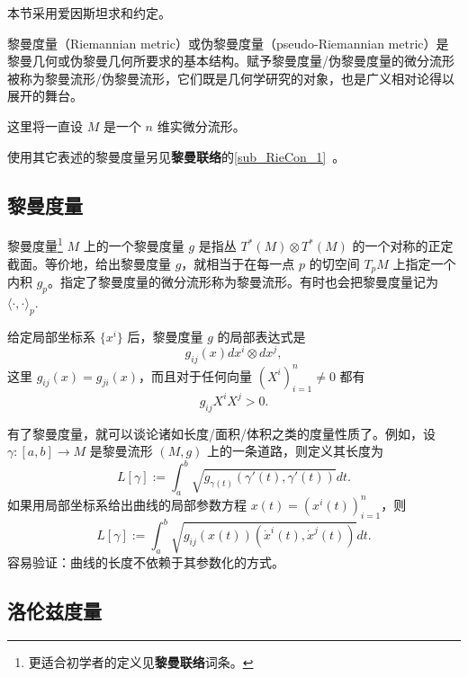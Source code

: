 
本节采用爱因斯坦求和约定。

黎曼度量（Riemannian metric）或伪黎曼度量（pseudo-Riemannian metric）是黎曼几何或伪黎曼几何所要求的基本结构。赋予黎曼度量/伪黎曼度量的微分流形被称为黎曼流形/伪黎曼流形，它们既是几何学研究的对象，也是广义相对论得以展开的舞台。

这里将一直设 $M$ 是一个 $n$ 维实微分流形。

使用其它表述的黎曼度量另见\textbf{黎曼联络}的\autoref{sub_RieCon_1}~。

\subsection{黎曼度量}
\begin{definition}{黎曼度量\footnote{更适合初学者的定义见\textbf{黎曼联络}词条。}}
$M$ 上的一个黎曼度量 $g$ 是指丛 $T^*(M)\otimes T^*(M)$ 的一个对称的正定截面。等价地，给出黎曼度量 $g$，就相当于在每一点 $p$ 的切空间 $T_pM$ 上指定一个内积 $g_p$。指定了黎曼度量的微分流形称为黎曼流形。有时也会把黎曼度量记为 $\langle\cdot,\cdot\rangle_p$.
\end{definition}
给定局部坐标系 $\{x^i\}$ 后，黎曼度量 $g$ 的局部表达式是
$$
g_{ij}(x)dx^i\otimes dx^j,
$$
这里 $g_{ij}(x)=g_{ji}(x)$，而且对于任何向量 $(X^i)_{i=1}^n\neq0$ 都有
$$
g_{ij}X^iX^j>0.
$$

有了黎曼度量，就可以谈论诸如长度/面积/体积之类的度量性质了。例如，设 $\gamma:[a,b]\to M$ 是黎曼流形 $(M,g)$ 上的一条道路，则定义其长度为
$$
L[\gamma]:=\int_{a}^b \sqrt{g_{\gamma(t)}(\gamma'(t),\gamma'(t))}dt.
$$
如果用局部坐标系给出曲线的局部参数方程 $x(t)=(x^i(t))_{i=1}^n$，则
$$
L[\gamma]:=\int_{a}^b \sqrt{g_{ij}(x(t))(\dot x^i(t),\dot x^j(t))}dt.
$$
容易验证：曲线的长度不依赖于其参数化的方式。

\subsection{洛伦兹度量}